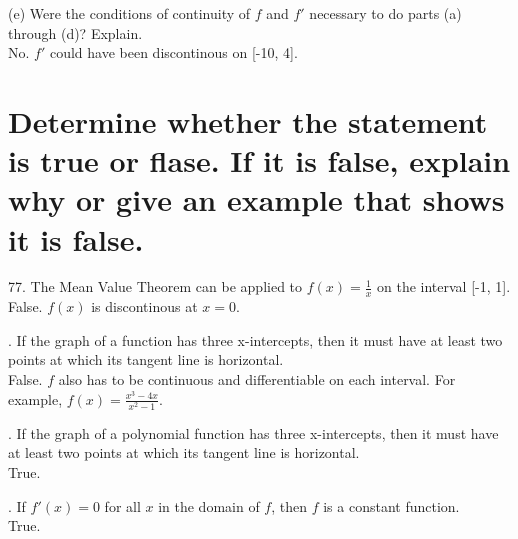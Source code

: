\documentclass[11pt]{article}
\begin{document}
\vspace{1cm}
\noindent
(e) Were the conditions of continuity of $f$ and $f'$ necessary to do parts (a) through (d)? Explain.\\
No. $f'$ could have been discontinous on [-10, 4].

\section{Determine whether the statement is true or flase. If it is false, explain why or give an example that shows it is false.}
77. The Mean Value Theorem can be applied to $f(x)=\frac{1}{x}$ on the interval [-1, 1].\\
\indent False. $f(x)$ is discontinous at $x=0$.

\vspace{1cm}
. If the graph of a function has three x-intercepts, then it must have at least two points at which its tangent line is horizontal.\\
\indent False. $f$ also has to be continuous and differentiable on each interval. For example, $f(x)=\frac{x^3-4x}{x^2-1}$.

\vspace{1cm}
. If the graph of a polynomial function has three x-intercepts, then it must have at least two points at which its tangent line is horizontal.\\
\indent True.

\vspace{1cm}
. If $f'(x)=0$ for all $x$ in the domain of $f$, then $f$ is a constant function.\\
\indent True.
\end{document}
